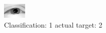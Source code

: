 \begin{figure}[h!]
\begin{center}
\includegraphics[width=0.60\columnwidth]{figures/ID2339_class_1_target_2.png}
\end{center}
\caption{ Classification: 1 actual target: 2}
\label{fig:ID2339_class_1_target_2}
\end{figure}
